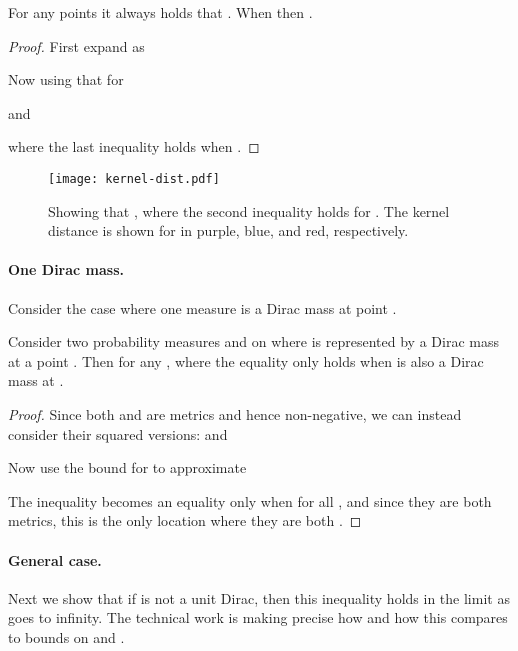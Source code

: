 \documentclass[11pt]{myclass}
\begin{document}
\begin{lemma}
\label{lem:E2DK}
For any points  it always holds that .  
When  then .  
\end{lemma}
\begin{proof}
First expand  as

Now using that  for 

and 

where the last inequality holds when .  
\end{proof}

\begin{figure}
\begin{center}\texttt{[image: kernel-dist.pdf]}\end{center}
\caption{\label{fig:Euc-bound}
\small \sffamily
Showing that , where the second inequality holds for .  The kernel distance  is shown for  in purple, blue, and red, respectively.  
}
\end{figure}



\paragraph{One Dirac mass.}
Consider the case where one measure  is a Dirac mass at point .    

\begin{lemma}
Consider two probability measures  and  on  where  is represented by a Dirac mass at a point .  
Then  for any , where the equality only holds when  is also a Dirac mass at .
\label{lem:2pts}
\end{lemma}
\begin{proof}
Since both  and  are metrics and hence non-negative, we can instead consider their squared versions:  and 
\vspace{-2mm}

Now use the bound  for  to approximate 

The inequality becomes an equality only when  for all , and since they are both metrics, this is the only location where they are both .  
\end{proof}


\paragraph{General case.}
Next we show that if  is not a unit Dirac, then this inequality holds in the limit as  goes to infinity.  The technical work is making precise how  and how this compares to bounds on  and .  
\end{document}
